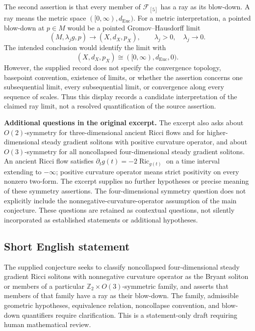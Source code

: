 \documentclass[11pt]{article}
\newcommand{\Z}{\mathbb{Z}}
\begin{document}
The second assertion is that every member of \(\mathcal F_{[5]}\) has a ray as its blow-down. A ray means the metric space \(([0,\infty),d_{\mathrm{Euc}})\). For a metric interpretation, a pointed blow-down at \(p\in M\) would be a pointed Gromov--Hausdorff limit
\[
(M,\lambda_j g,p)\longrightarrow(X,d_X,p_X),
\qquad \lambda_j>0,\quad\lambda_j\longrightarrow0.
\]
The intended conclusion would identify the limit with
\[
(X,d_X,p_X)\cong([0,\infty),d_{\mathrm{Euc}},0).
\]
However, the supplied record does not specify the convergence topology, basepoint convention, existence of limits, or whether the assertion concerns one subsequential limit, every subsequential limit, or convergence along every sequence of scales. Thus this display records a candidate interpretation of the claimed ray limit, not a resolved quantification of the source assertion.

\textbf{Additional questions in the original excerpt.} The excerpt also asks about \(O(2)\)-symmetry for three-dimensional ancient Ricci flows and for higher-dimensional steady gradient solitons with positive curvature operator, and about \(O(3)\)-symmetry for all noncollapsed four-dimensional steady gradient solitons. An ancient Ricci flow satisfies \(\partial_tg(t)=-2\operatorname{Ric}_{g(t)}\) on a time interval extending to \(-\infty\); positive curvature operator means strict positivity on every nonzero two-form. The excerpt supplies no further hypotheses or precise meaning of these symmetry assertions. The four-dimensional symmetry question does not explicitly include the nonnegative-curvature-operator assumption of the main conjecture. These questions are retained as contextual questions, not silently incorporated as established statements or additional hypotheses.
\subsection{Short English statement}
The supplied conjecture seeks to classify noncollapsed four-dimensional steady gradient Ricci solitons with nonnegative curvature operator as the Bryant soliton or members of a particular \(\Z_2\times O(3)\)-symmetric family, and asserts that members of that family have a ray as their blow-down. The family, admissible geometric hypotheses, equivalence relation, noncollapse convention, and blow-down quantifiers require clarification. This is a statement-only draft requiring human mathematical review.
\end{document}
